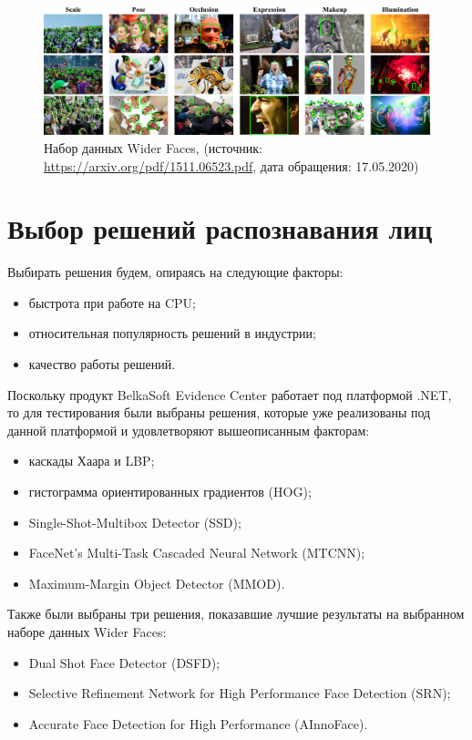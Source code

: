 \documentclass[14pt]{matmex-diploma-custom}
\begin{document}
    \begin{figure}[h]
            \centering
            \includegraphics[width=1\textwidth]{images/intro.jpg}
            \caption{Набор данных Wider Faces, (источник: \url{https://arxiv.org/pdf/1511.06523.pdf}, дата обращения: 17.05.2020)}
    \end{figure}
    
\section{Выбор решений распознавания лиц}
    Выбирать решения будем, опираясь на следующие факторы:
    \begin{itemize}
        \item быстрота при работе на CPU;
        \item относительная популярность решений в индустрии;
        \item качество работы решений.
    \end{itemize}
    Поскольку продукт BelkaSoft Evidence Center работает под платформой .NET, то для тестирования были выбраны решения, которые уже реализованы под данной платформой и удовлетворяют вышеописанным факторам:
    \begin{itemize}
        \item каскады Хаара и LBP;
        \item гистограмма ориентированных градиентов (HOG);
        \item Single-Shot-Multibox Detector (SSD);
        \item FaceNet's Multi-Task Cascaded Neural Network (MTCNN);
        \item Maximum-Margin Object Detector (MMOD).
    \end{itemize}
    
    Также были выбраны три решения, показавшие лучшие результаты на выбранном наборе данных Wider Faces:
    \begin{itemize}
        \item Dual Shot Face Detector (DSFD);
        \item Selective Refinement Network for High Performance Face Detection (SRN);
        \item Accurate Face Detection for High Performance (AInnoFace).
    \end{itemize}
    
\end{document}
